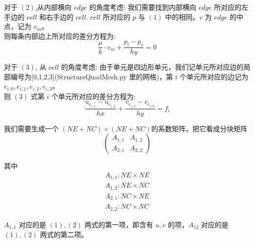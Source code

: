 \documentclass{article}
\begin{document}
对于 $(2)$,从内部横向 $edge$ 的角度考虑:
我们需要找到内部横向 $edge$ 所对应的左手边的 $cell$ 和右手边的 $cell$. $cell$ 所对应的 $p$ 与 $(1)$ 中的相同。$v$ 为 $edge$ 的中点，记为 $v_m$。\\

则每条内部边上所对应的差分方程为:\\

\begin{equation*}
\frac{\mu}{k} \cdot v_m + \frac{p_l - p_r}{hy} = 0
\end{equation*}

对于 $(3)$, 从 $cell$ 的角度考虑:
由于单元是四边形单元，我们记单元所对应边的局部编号为[0,1,2,3](StructureQuadMesh.py 里的网格)，第 $i$ 个单元所对应的边记为 $e_{i,0},e_{i,1},e_{i,2},e_{i,3}$。\\

则 $(3)$ 式第 $i$ 个单元所对应的差分方程为:\\

\begin{equation*}
\frac{u_{e_{i,1}} - u_{e_{i,3}}}{hx} + \frac{v_{e_{i,2}} - v_{e_{i,0}}}{hy} = f_i
\end{equation*}

我们需要生成一个 $(NE+NC)\times(NE+NC)$的系数矩阵，把它看成分块矩阵
\begin{equation*}
\begin{pmatrix}
A_{1,1} & A_{1,2} \\
A_{2,1} & A_{2,2}
\end{pmatrix}
\end{equation*}

其中 \\

\begin{equation*}
\begin{aligned}
A_{1,1} : NE\times NE \\
A_{1,2} : NE\times NC \\
A_{2,1} : NC\times NE \\
A_{2,2} : NC\times NC
\end{aligned}
\end{equation*}

$A_{1,1}$ 对应的是 $(1),(2)$ 两式的第一项，即含有 $u,v$ 的项，$A_12$ 对应的是 $(1),(2)$ 两式的第二项。

\newpage
\nocite{*}

\end{document}
